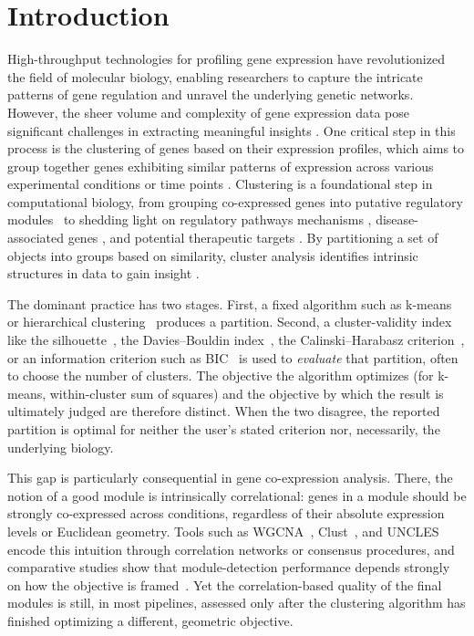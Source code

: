 \section*{Introduction}

High-throughput technologies for profiling gene expression have revolutionized the field of molecular biology, enabling researchers to capture the intricate patterns of gene regulation and unravel the underlying genetic networks. However, the sheer volume and complexity of gene expression data pose significant challenges in extracting meaningful insights \cite{lorenaComplexityGeneExpression2008}. One critical step in this process is the clustering of genes based on their expression profiles, which aims to group together genes exhibiting similar patterns of expression across various experimental conditions or time points \cite{Saelens2018}. Clustering is a foundational step in computational biology, from grouping co-expressed genes into putative regulatory modules~\cite{Eisen1998,Wolfe2005} to shedding light on regulatory pathways mechanisms \cite{vengatharajulooGeneCoExpressionNetwork2023}, disease-associated genes \cite{vandamGeneCoexpressionAnalysis2017}, and potential therapeutic targets \cite{hasankhaniDifferentialCoExpressionNetwork2021}. By partitioning a set of objects into groups based on similarity, cluster analysis identifies intrinsic structures in data to gain insight \cite{hruschka2004, pirim2012}.  

The dominant practice has two stages. First, a fixed algorithm such as k-means~\cite{MacQueen1967} or hierarchical clustering~\cite{Eisen1998} produces a partition. Second, a cluster-validity index like the silhouette~\cite{Rousseeuw1987}, 
the Davies--Bouldin index~\cite{DaviesBouldin1979}, the Calinski--Harabasz
criterion~\cite{CalinskiHarabasz1974}, or an information criterion such as
BIC~\cite{Schwarz1978} is used to \emph{evaluate} that partition, often
to choose the number of clusters. The objective the algorithm optimizes (for
k-means, within-cluster sum of squares) and the objective by which the result is
ultimately judged are therefore distinct. When the two disagree, the reported
partition is optimal for neither the user's stated criterion nor, necessarily,
the underlying biology.

This gap is particularly consequential in gene co-expression analysis. There,
the notion of a good module is intrinsically correlational: genes in a module
should be strongly co-expressed across conditions, regardless of their absolute
expression levels or Euclidean geometry. Tools such as WGCNA~\cite{Langfelder2008},
Clust~\cite{AbuJamous2018}, and UNCLES~\cite{AbuJamous2015} encode this intuition
through correlation networks or consensus procedures, and comparative studies
show that module-detection performance depends strongly on how the objective is
framed~\cite{Saelens2018}. Yet the correlation-based quality of the final
modules is still, in most pipelines, assessed only after the clustering
algorithm has finished optimizing a different, geometric objective.

